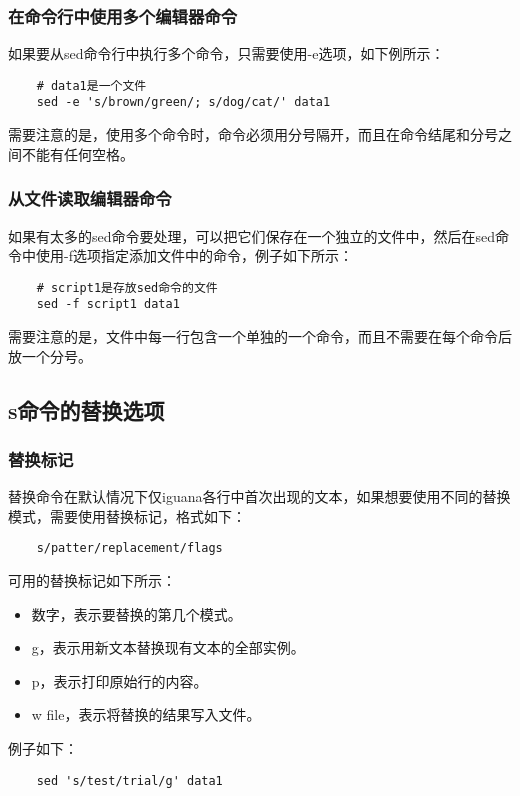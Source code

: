 \documentclass[a4paper,left=2.5cm,right=2.5cm,11pt]{article}
\begin{document}
\subsubsection{在命令行中使用多个编辑器命令}
	如果要从sed命令行中执行多个命令，只需要使用-e选项，如下例所示：
	\begin{lstlisting}
	# data1是一个文件
	sed -e 's/brown/green/; s/dog/cat/' data1
	\end{lstlisting}

	需要注意的是，使用多个命令时，命令必须用分号隔开，而且在命令结尾和分号之间不能有任何空格。

\subsubsection{从文件读取编辑器命令}
	如果有太多的sed命令要处理，可以把它们保存在一个独立的文件中，然后在sed命令中使用-f选项指定添加文件中的命令，例子如下所示：
	\begin{lstlisting}
	# script1是存放sed命令的文件
	sed -f script1 data1
	\end{lstlisting}

	需要注意的是，文件中每一行包含一个单独的一个命令，而且不需要在每个命令后放一个分号。

\subsection{s命令的替换选项}
\subsubsection{替换标记}
	替换命令在默认情况下仅iguana各行中首次出现的文本，如果想要使用不同的替换模式，需要使用替换标记，格式如下：
	\begin{lstlisting}
	s/patter/replacement/flags
	\end{lstlisting}

	可用的替换标记如下所示：
	\begin{itemize}
		\item 数字，表示要替换的第几个模式。
		\item g，表示用新文本替换现有文本的全部实例。
		\item p，表示打印原始行的内容。
		\item w file，表示将替换的结果写入文件。
	\end{itemize}

	例子如下：
	\begin{lstlisting}
	sed 's/test/trial/g' data1
	\end{lstlisting}
\end{document}
